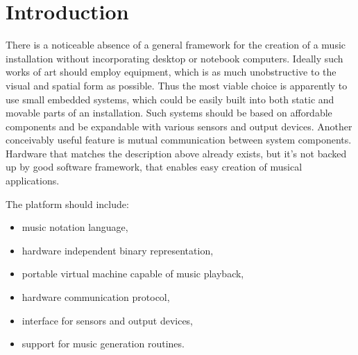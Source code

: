 \documentclass{article}
\title{\papertitle}
\begin{document}
\capstartfalse %
\maketitle %
\capstarttrue %

\begin{abstract}
Application of embedded systems to music installations is limited due to
absence of convenient software development tools. This is a very unfortunate
situation as these systems offer a set of advantages in comparison to desktop
or laptop computers. Embedded devices are small in size therefore easier to
incorporate into the form of the work. These devices are effortlessly
expandable with various sensors and controllers. Moreover they are affordable,
which creates possibility to build networks of cooperating devices.

In this paper we describe a design of Komeda -- the platform for interactive
algorithmic music on embedded systems. The framework consist of language based
on the score-with-blanks approach, the intermediate binary representation,
portable virtual machine and module system.
\end{abstract}
%

\section{Introduction}
\label{sec:introduction}

There is a noticeable absence of a general framework for the creation of a
music installation without incorporating desktop or notebook computers. Ideally
such works of art should employ equipment, which is as much unobstructive to
the visual and spatial form as possible. Thus the most viable choice is
apparently to use small embedded systems, which could be easily built into both
static and movable parts of an installation. Such systems should be based on
affordable components and be expandable with various sensors and output
devices. Another conceivably useful feature is mutual communication between
system components. Hardware that matches the description above already exists,
but it's not backed up by good software framework, that enables easy creation
of musical applications.

The platform should include:
\begin{itemize}
  \item music notation language,
  \item hardware independent binary representation,
  \item portable virtual machine capable of music playback,
  \item hardware communication protocol,
  \item interface for sensors and output devices,
  \item support for music generation routines.
\end{itemize}
\end{document}
